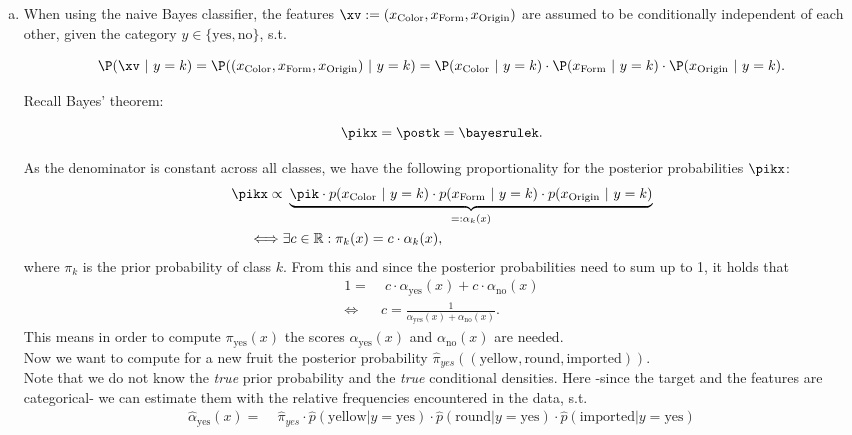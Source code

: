 \begin{enumerate}[a)]

  \item When using the naive Bayes classifier, the features $\xv := 
  (x_\text{Color},x_\text{Form},x_\text{Origin})$ are assumed to be 
  conditionally independent of each other, given the category $y \in 
  \{\text{yes}, \text{no}\}$, s.t.

  $$ \P(\xv ~|~ y = k) =
  \P((x_\text{Color}, x_\text{Form}, x_\text{Origin}) ~|~ y = k) = 
  \P(x_\text{Color} ~|~ y = k) \cdot \P(x_\text{Form} ~|~ y = k) \cdot 
  \P(x_\text{Origin} ~|~ y = k).$$
  
  Recall Bayes' theorem:
  
  $$\pikx = \postk = \bayesrulek.$$

  As the denominator is constant across all classes, we have the following 
  proportionality for the posterior probabilities $\pikx$:
  \begin{align*} 
    \pikx \propto & ~ \underbrace{\pik \cdot p(x_\text{Color} ~|~ y = k)
    \cdot p(x_\text{Form} ~|~ y = k) \cdot p(x_\text{Origin} ~|~ y = k)}_{=: 
    \alpha_k(x)} \\
  \iff & \exists c \in \mathbb{R}: \pi_k(x) = c \cdot \alpha_k(x),\end{align*}
  where $\pi_k$ is the prior probability of class $k$.
  From this and since the posterior probabilities need to sum up to 1, it holds that 
  \begin{align*}1 =& \; c \cdot \alpha_\text{yes}(x) +  c \cdot \alpha_\text{no}(x)\\
  \iff & c = \frac{1}{\alpha_\text{yes}(x) + \alpha_\text{no}(x)}.
  \end{align*}
  This means in order to compute $\pi_\text{yes}(x)$ the scores $\alpha_\text{yes}(x)$ and $\alpha_\text{no}(x)$ are needed.\\ Now we want to compute for a new fruit the posterior probability $\hat{\pi}_{yes}((\text{yellow},\text{round},\text{imported}))$. \\
  Note that we do not know the \emph{true} prior probability and the \emph{true} conditional densities. Here -since the target and the features are categorical- we can estimate them with the relative frequencies encountered in the data, s.t.
  \begin{align*}
  \hat{\alpha}_\text{yes}(x) = & \;  \hat{\pi}_{yes} \cdot \hat{p}(\text{yellow}|y = \text{yes})\cdot \hat{p}(\text{round}|y = \text{yes}) \cdot \hat{p}(\text{imported}|y = \text{yes}) \\

\end{align*}
\end{enumerate}
